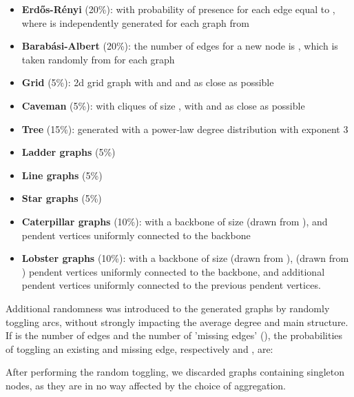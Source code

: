\documentclass{article}
\begin{document}
\begin{itemize}
    \item \textbf{Erd\H{o}s-R\'{e}nyi} \cite{erdos1960} (20\%): with probability of presence for each edge equal to , where  is independently generated for each graph from 
    
    \item \textbf{Barab\'{a}si-Albert} \cite{albert2002} (20\%): the number of edges for a new node is , which is taken randomly from  for each graph
    
    \item \textbf{Grid} (5\%):  2d grid graph with  and  and  as close as possible 
    
    \item \textbf{Caveman} \cite{watts1999caveman} (5\%): with  cliques of size , with  and  as close as possible 
    
    \item \textbf{Tree} (15\%): generated with a power-law degree distribution with exponent 3 
    
    \item \textbf{Ladder graphs} (5\%)
    
    \item \textbf{Line graphs} (5\%)
    
    \item \textbf{Star graphs} (5\%)
    
    \item \textbf{Caterpillar graphs} (10\%): with a backbone of size  (drawn from ), and  pendent vertices uniformly connected to the backbone 
    
    \item \textbf{Lobster graphs} (10\%): with a backbone of size  (drawn from ),  (drawn from ) pendent vertices uniformly connected to the backbone, and additional  pendent vertices uniformly connected to the previous pendent vertices.
\end{itemize}

Additional randomness was introduced to the generated graphs by randomly toggling arcs, without strongly impacting the average degree and main structure. If  is the number of edges and  the number of 'missing edges' (), the probabilities of toggling an existing and missing edge, respectively  and , are:

After performing the random toggling, we discarded graphs containing singleton nodes, as they are in no way affected by the choice of aggregation.
\end{document}
